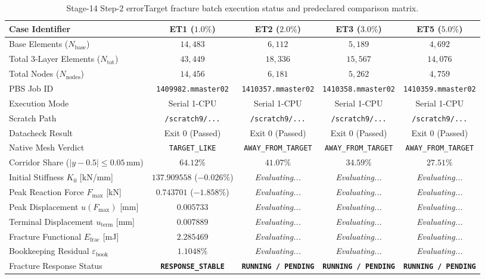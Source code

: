 \begin{table}[htbp]
\centering
\small
\caption{Stage-14 Step-2 errorTarget fracture batch execution status and predeclared comparison matrix.}
\label{tab:step2_fracture_batch_status}
\begin{tabular}{lcccc}
\toprule
\textbf{Case Identifier} & \textbf{ET1 ($1.0\%$)} & \textbf{ET2 ($2.0\%$)} & \textbf{ET3 ($3.0\%$)} & \textbf{ET5 ($5.0\%$)} \\
\midrule
Base Elements ($N_{\mathrm{base}}$) & $14{,}483$ & $6{,}112$ & $5{,}189$ & $4{,}692$ \\
Total 3-Layer Elements ($N_{\mathrm{tot}}$) & $43{,}449$ & $18{,}336$ & $15{,}567$ & $14{,}076$ \\
Total Nodes ($N_{\mathrm{nodes}}$) & $14{,}456$ & $6{,}181$ & $5{,}262$ & $4{,}759$ \\
PBS Job ID & \texttt{1409982.mmaster02} & \texttt{1410357.mmaster02} & \texttt{1410358.mmaster02} & \texttt{1410359.mmaster02} \\
Execution Mode & Serial 1-CPU & Serial 1-CPU & Serial 1-CPU & Serial 1-CPU \\
Scratch Path & \texttt{/scratch9/...} & \texttt{/scratch9/...} & \texttt{/scratch9/...} & \texttt{/scratch9/...} \\
Datacheck Result & Exit 0 (Passed) & Exit 0 (Passed) & Exit 0 (Passed) & Exit 0 (Passed) \\
Native Mesh Verdict & \texttt{TARGET\_LIKE} & \texttt{AWAY\_FROM\_TARGET} & \texttt{AWAY\_FROM\_TARGET} & \texttt{AWAY\_FROM\_TARGET} \\
Corridor Share ($|y-0.5| \le 0.05\,\mathrm{mm}$) & $64.12\%$ & $41.07\%$ & $34.59\%$ & $27.51\%$ \\
Initial Stiffness $K_0$ [kN/mm] & $137.909558$ ($-0.026\%$) & \textit{Evaluating...} & \textit{Evaluating...} & \textit{Evaluating...} \\
Peak Reaction Force $F_{\max}$ [kN] & $0.743701$ ($-1.858\%$) & \textit{Evaluating...} & \textit{Evaluating...} & \textit{Evaluating...} \\
Peak Displacement $u(F_{\max})$ [mm] & $0.005733$ & \textit{Evaluating...} & \textit{Evaluating...} & \textit{Evaluating...} \\
Terminal Displacement $u_{\mathrm{term}}$ [mm] & $0.007889$ & \textit{Evaluating...} & \textit{Evaluating...} & \textit{Evaluating...} \\
Fracture Functional $E_{\mathrm{frac}}$ [mJ] & $2.285469$ & \textit{Evaluating...} & \textit{Evaluating...} & \textit{Evaluating...} \\
Bookkeeping Residual $\varepsilon_{\mathrm{book}}$ & $1.1048\%$ & \textit{Evaluating...} & \textit{Evaluating...} & \textit{Evaluating...} \\
Fracture Response Status & \textbf{\texttt{RESPONSE\_STABLE}} & \textbf{\texttt{RUNNING / PENDING}} & \textbf{\texttt{RUNNING / PENDING}} & \textbf{\texttt{RUNNING / PENDING}} \\
\bottomrule
\end{tabular}
\end{table}
